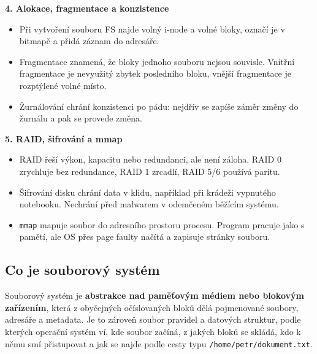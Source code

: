 \documentclass[11pt,a4paper]{article}
\begin{document}
\textbf{4. Alokace, fragmentace a konzistence}
\begin{itemize}
  \item Při vytvoření souboru FS najde volný i-node a volné bloky, označí je v bitmapě a přidá záznam do adresáře.
  \item Fragmentace znamená, že bloky jednoho souboru nejsou souvisle. Vnitřní fragmentace je nevyužitý zbytek posledního bloku, vnější fragmentace je rozptýlené volné místo.
  \item Žurnálování chrání konzistenci po pádu: nejdřív se zapíše záměr změny do žurnálu a pak se provede změna.
\end{itemize}

\textbf{5. RAID, šifrování a mmap}
\begin{itemize}
  \item RAID řeší výkon, kapacitu nebo redundanci, ale není záloha. RAID 0 zrychluje bez redundance, RAID 1 zrcadlí, RAID 5/6 používá paritu.
  \item Šifrování disku chrání data v klidu, například při krádeži vypnutého notebooku. Nechrání před malwarem v odemčeném běžícím systému.
  \item \texttt{mmap} mapuje soubor do adresního prostoru procesu. Program pracuje jako s pamětí, ale OS přes page faulty načítá a zapisuje stránky souboru.
\end{itemize}

\subsection*{Co je souborový systém}
Souborový systém je \textbf{abstrakce nad paměťovým médiem nebo blokovým zařízením}, která z obyčejných očíslovaných bloků dělá pojmenované soubory, adresáře a metadata. Je to zároveň soubor pravidel a datových struktur, podle kterých operační systém ví, kde soubor začíná, z jakých bloků se skládá, kdo k němu smí přistupovat a jak se najde podle cesty typu \texttt{/home/petr/dokument.txt}.
\end{document}
